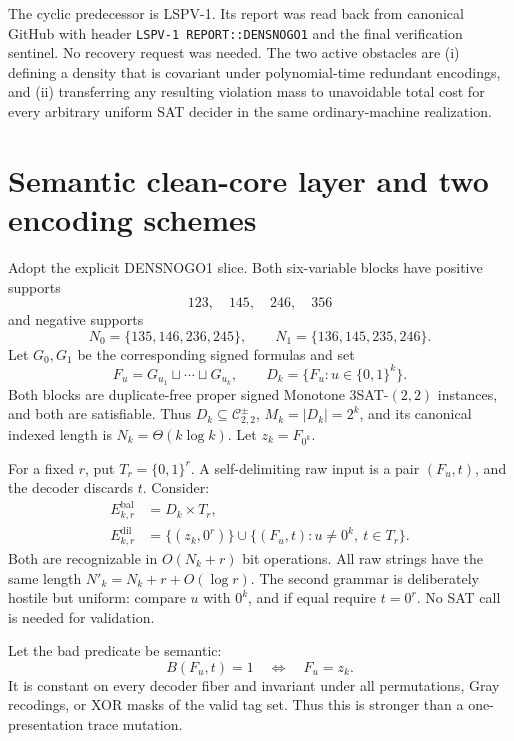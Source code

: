 \documentclass[11pt]{article}
\newcommand{\Core}{\mathcal C_{2,2}^{\pm}}
\begin{document}
The cyclic predecessor is LSPV-1. Its report
was read back from canonical GitHub with header
\texttt{LSPV-1 REPORT::DENSNOGO1} and the final verification sentinel. No
recovery request was needed. The two active obstacles are (i) defining a
density that is covariant under polynomial-time redundant encodings, and
(ii) transferring any resulting violation mass to unavoidable total cost for
every arbitrary uniform SAT decider in the same ordinary-machine realization.

\section{Semantic clean-core layer and two encoding schemes}
Adopt the explicit DENSNOGO1 slice.  Both six-variable blocks have positive
supports
\[
123,\quad145,\quad246,\quad356
\]
and negative supports
\[
N_0=\{135,146,236,245\},\qquad
N_1=\{136,145,235,246\}.
\]
Let \(G_0,G_1\) be the corresponding signed formulas and set
\[
 F_u=G_{u_1}\sqcup\cdots\sqcup G_{u_k},\qquad
 D_k=\{F_u:u\in\{0,1\}^k\}.                              \tag{1}
\]
Both blocks are duplicate-free proper signed Monotone
\(3\)SAT-\((2,2)\) instances, and both are satisfiable.  Thus
\(D_k\subseteq\Core\), \(M_k=|D_k|=2^k\), and its canonical indexed length is
\(N_k=\Theta(k\log k)\). Let \(z_k=F_{0^k}\).

For a fixed \(r\), put \(T_r=\{0,1\}^r\).  A self-delimiting raw input is a
pair \((F_u,t)\), and the decoder discards \(t\).  Consider:
\begin{align}
 E^{\mathrm{bal}}_{k,r}&=D_k\times T_r,                    \tag{2}\\
 E^{\mathrm{dil}}_{k,r}&=\{(z_k,0^r)\}
   \cup\{(F_u,t):u\ne0^k,\ t\in T_r\}.                  \tag{3}
\end{align}
Both are recognizable in \(O(N_k+r)\) bit operations.  All raw strings have
the same length \(N'_k=N_k+r+O(\log r)\).  The second grammar is deliberately
hostile but uniform: compare \(u\) with \(0^k\), and if equal require
\(t=0^r\).  No SAT call is needed for validation.

Let the bad predicate be semantic:
\[
 B(F_u,t)=1\quad\Longleftrightarrow\quad F_u=z_k.          \tag{4}
\]
It is constant on every decoder fiber and invariant under all permutations,
Gray recodings, or XOR masks of the valid tag set.  Thus this is stronger than
a one-presentation trace mutation.
\end{document}

